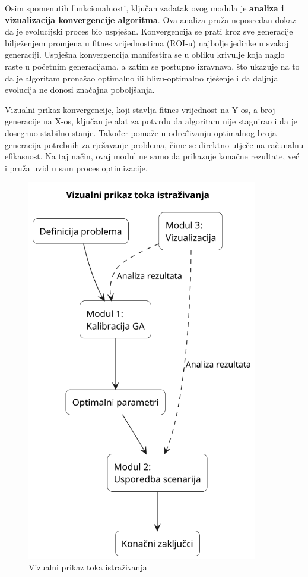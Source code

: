    Osim spomenutih funkcionalnosti, ključan zadatak ovog modula je \textbf{analiza i vizualizacija konvergencije algoritma}. Ova analiza pruža neposredan dokaz da je evolucijski proces bio uspješan. Konvergencija se prati kroz sve generacije bilježenjem promjena u fitnes vrijednostima (ROI-u) najbolje jedinke u svakoj generaciji. Uspješna konvergencija manifestira se u obliku krivulje koja naglo raste u početnim generacijama, a zatim se postupno izravnava, što ukazuje na to da je algoritam pronašao optimalno ili blizu-optimalno rješenje i da daljnja evolucija ne donosi značajna poboljšanja.

Vizualni prikaz konvergencije, koji stavlja fitnes vrijednost na Y-os, a broj generacije na X-os, ključan je alat za potvrdu da algoritam nije stagnirao i da je dosegnuo stabilno stanje. Također pomaže u određivanju optimalnog broja generacija potrebnih za rješavanje problema, čime se direktno utječe na računalnu efikasnost. Na taj način, ovaj modul ne samo da prikazuje konačne rezultate, već i pruža uvid u sam proces optimizacije.   

\begin{figure}[H]
    \centering
    \includegraphics[width=0.9\textwidth]{slike/tijek_istrazivanja.png}
    \caption{Vizualni prikaz toka istraživanja}
    \label{fig:tok_istrazivanja}
\end{figure}
